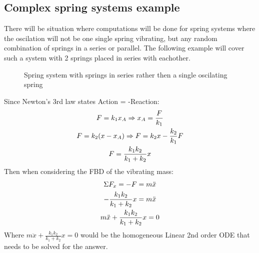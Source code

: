 \documentclass[11pt, a4paper]{article}
\begin{document}
\subsection{Complex spring systems example}
\setcounter{equation}{0}
There will be situation where computations will be done for spring systems where the oscilation will not be one single spring vibrating, but any random combination of springs in a series or parallel. The following example will cover such a system with 2 springs placed in series with eachother.
\begin{figure}[h]
  \centering
  \qquad
  \qquad
  \caption{Spring system with springs in series rather then a single oscilating spring}
\end{figure}
Since Newton's 3rd law states Action = -Reaction:
\begin{gather}
  F = k_1x_A \Rightarrow x_A = \frac{F}{k_1} \notag\\
  F = k_2(x-x_A) \Rightarrow F = k_2x - \frac{k_2}{k_1}F \notag\\
  F = \frac{k_1k_2}{k_1 + k_2}x
\end{gather}
Then when considering the FBD of the vibrating mass:
\begin{gather}
  \Sigma F_x = -F = m\ddot{x} \notag\\
  -\frac{k_1k_2}{k_1 + k_2}x = m\ddot{x} \notag\\
  m\ddot{x} + \frac{k_1k_2}{k_1 + k_2}x = 0
\end{gather}
Where $m\ddot{x} + \frac{k_1k_2}{k_1 + k_2}x = 0$ would be the homogeneous Linear 2nd order ODE that needs to be solved for the answer.
\end{document}
